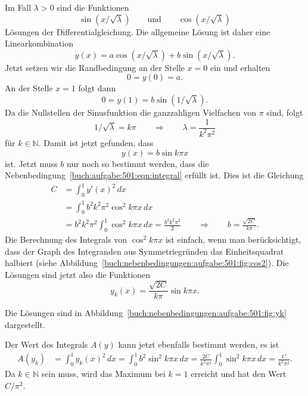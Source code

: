 \begin{loesung}
Im Fall $\lambda>0$ sind die Funktionen
\[
\sin(x/\!\sqrt{\lambda})
\qquad\text{und}\qquad
\cos(x/\!\sqrt{\lambda})
\]
Lösungen der Differentialgleichung.
Die allgemeine Lösung ist daher eine Linearkombination
\[
y(x)
=
a \cos(x/\!\sqrt{\lambda})
+
b \sin(x/\!\sqrt{\lambda}).
\]
Jetzt setzen wir die Randbedingung an der Stelle $x=0$ ein und erhalten
\[
0
=
y(0)
=
a.
\]
An der Stelle $x=1$ folgt dann
\[
0=y(1)
=
b\sin(1/\!\sqrt{\lambda}).
\]
Da die Nullstellen der Sinusfunktion die ganzzahligen Vielfachen von $\pi$
sind, folgt
\[
1/\!\sqrt{\lambda} = k\pi
\qquad\Rightarrow\qquad
\lambda = \frac{1}{k^2\pi^2}
\]
für $k\in\mathbb{N}$.
Damit ist jetzt gefunden, dass
\[
y(x) = b \sin k\pi x
\]
ist.
Jetzt muss $b$ nur noch so bestimmt werden, dass die
Nebenbedingung~\eqref{buch:aufgabe:501:eqn:integral} erfüllt ist.
Dies ist die Gleichung
\begin{align*}
C
&=
\int_0^1 y'(x)^2\,dx
\\
&=
\int_0^1 b^2 k^2\pi^2 \cos^2 k\pi x\,dx
\\
&=
b^2k^2\pi^2 \int_0^1 \cos^2 k\pi x\,dx
=
\frac{b^2k^2\pi^2}2
\qquad
\Rightarrow
\qquad
b
=
\frac{\!\sqrt{2C}}{k\pi}.
\end{align*}
%
Die Berechnung des Integrals von $\cos^2 k\pi x$ ist einfach, wenn man
berücksichtigt, dass der Graph des Integranden aus Symmetriegründen
das Einheitsquadrat halbiert (siehe
Abbildung~\ref{buch:nebenbedingungen:aufgabe:501:fig:cos2}).
Die Lösungen sind jetzt also die Funktionen
\[
y_k(x)
= 
\frac{\!\sqrt{2C}}{k\pi}
\sin k\pi x.
\]

Die Lösungen sind in Abbildung~\ref{buch:nebenbedingungen:aufgabe:501:fig:yk}
dargestellt.

Der Wert des Integrals $A(y)$ kann jetzt ebenfalls bestimmt werden, es
ist
\begin{align*}
A(y_k)
&=
\int_0^1 y_k(x)^2\,dx
=
\int_0^1 b^2\sin^2 k\pi x\,dx
=
\frac{2C}{k^2\pi^2} \int_0^1 \sin^2k\pi x\,dx
=
\frac{C}{k^2\pi^2}.
\end{align*}
Da $k\in\mathbb{N}$ sein muss, wird das Maximum bei $k=1$ erreicht und
hat den Wert $C/\pi^2$.
\end{loesung}
